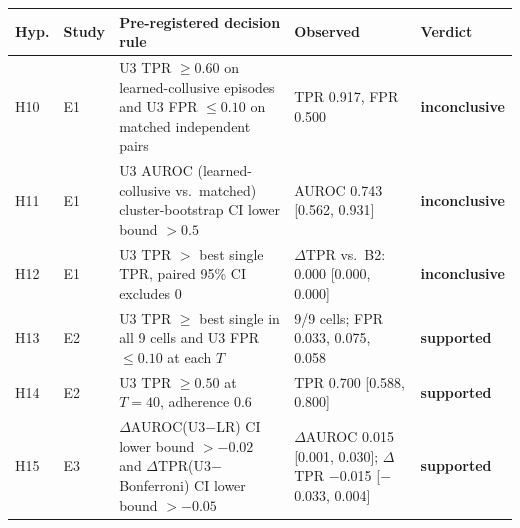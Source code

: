 \begin{tabular}{llp{5.6cm}p{4.6cm}l}
\toprule
Hyp. & Study & Pre-registered decision rule & Observed & Verdict \\
\midrule
H10 & E1 & U3 TPR $\ge 0.60$ on learned-collusive episodes and U3 FPR $\le 0.10$ on matched independent pairs & TPR 0.917, FPR 0.500 & \textbf{inconclusive} \\
H11 & E1 & U3 AUROC (learned-collusive vs.\ matched) cluster-bootstrap CI lower bound $>0.5$ & AUROC 0.743 [0.562, 0.931] & \textbf{inconclusive} \\
H12 & E1 & U3 TPR $>$ best single TPR, paired 95\% CI excludes 0 & $\Delta$TPR vs.\ B2: 0.000 [0.000, 0.000] & \textbf{inconclusive} \\
H13 & E2 & U3 TPR $\ge$ best single in all 9 cells and U3 FPR $\le 0.10$ at each $T$ & 9/9 cells; FPR 0.033, 0.075, 0.058 & \textbf{supported} \\
H14 & E2 & U3 TPR $\ge 0.50$ at $T{=}40$, adherence 0.6 & TPR 0.700 [0.588, 0.800] & \textbf{supported} \\
H15 & E3 & $\Delta$AUROC(U3$-$LR) CI lower bound $>-0.02$ and $\Delta$TPR(U3$-$Bonferroni) CI lower bound $>-0.05$ & $\Delta$AUROC 0.015 [0.001, 0.030]; $\Delta$TPR \ensuremath{-}0.015 [\ensuremath{-}0.033, 0.004] & \textbf{supported} \\
\bottomrule
\end{tabular}
